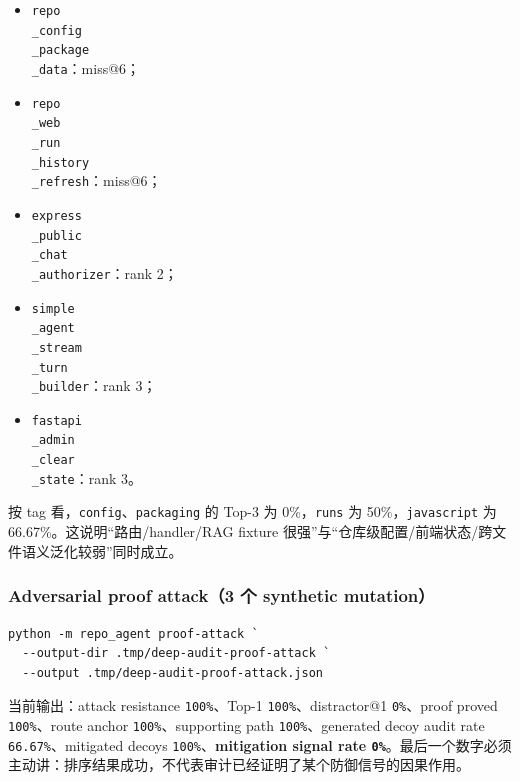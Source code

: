 \documentclass[UTF8,12pt,openany]{ctexbook}
\begin{document}
\begin{itemize}
\item \texttt{repo\\_config\\_package\\_data}：miss@6；
\item \texttt{repo\\_web\\_run\\_history\\_refresh}：miss@6；
\item \texttt{express\\_public\\_chat\\_authorizer}：rank 2；
\item \texttt{simple\\_agent\\_stream\\_turn\\_builder}：rank 3；
\item \texttt{fastapi\\_admin\\_clear\\_state}：rank 3。
\end{itemize}

按 tag 看，\texttt{config}、\texttt{packaging} 的 Top-3 为 0\%，\texttt{runs} 为 50\%，\texttt{javascript} 为 66.67\%。这说明“路由/handler/RAG fixture 很强”与“仓库级配置/前端状态/跨文件语义泛化较弱”同时成立。\par

\subsubsection{Adversarial proof attack（3 个 synthetic mutation）}

\begin{lstlisting}
python -m repo_agent proof-attack `
  --output-dir .tmp/deep-audit-proof-attack `
  --output .tmp/deep-audit-proof-attack.json
\end{lstlisting}

当前输出：attack resistance \texttt{100\%}、Top-1 \texttt{100\%}、distractor@1 \texttt{0\%}、proof proved \texttt{100\%}、route anchor \texttt{100\%}、supporting path \texttt{100\%}、generated decoy audit rate \texttt{66.67\%}、mitigated decoys \texttt{100\%}、\textbf{mitigation signal rate \texttt{0\%}}。最后一个数字必须主动讲：排序结果成功，不代表审计已经证明了某个防御信号的因果作用。\par
\end{document}
